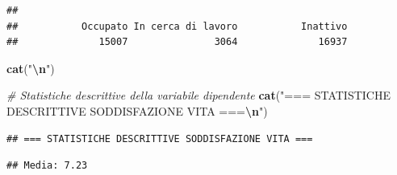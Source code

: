 \documentclass[
]{article}
\newenvironment{Shaded}{\begin{snugshade}}{\end{snugshade}}
\newcommand{\CommentTok}[1]{\textcolor[rgb]{0.56,0.35,0.01}{\textit{#1}}}
\newcommand{\DecValTok}[1]{\textcolor[rgb]{0.00,0.00,0.81}{#1}}
\newcommand{\FunctionTok}[1]{\textcolor[rgb]{0.13,0.29,0.53}{\textbf{#1}}}
\newcommand{\NormalTok}[1]{#1}
\newcommand{\SpecialCharTok}[1]{\textcolor[rgb]{0.81,0.36,0.00}{\textbf{#1}}}
\newcommand{\StringTok}[1]{\textcolor[rgb]{0.31,0.60,0.02}{#1}}
\begin{document}
\begin{verbatim}
## 
##           Occupato In cerca di lavoro           Inattivo 
##              15007               3064              16937
\end{verbatim}

\begin{Shaded}
\begin{Highlighting}[]
\FunctionTok{cat}\NormalTok{(}\StringTok{"}\SpecialCharTok{\textbackslash{}n}\StringTok{"}\NormalTok{)}
\end{Highlighting}
\end{Shaded}

\begin{Shaded}
\begin{Highlighting}[]
\CommentTok{\# Statistiche descrittive della variabile dipendente}
\FunctionTok{cat}\NormalTok{(}\StringTok{"=== STATISTICHE DESCRITTIVE SODDISFAZIONE VITA ===}\SpecialCharTok{\textbackslash{}n}\StringTok{"}\NormalTok{)}
\end{Highlighting}
\end{Shaded}

\begin{verbatim}
## === STATISTICHE DESCRITTIVE SODDISFAZIONE VITA ===
\end{verbatim}

\begin{Shaded}
\end{Shaded}

\begin{verbatim}
## Media: 7.23
\end{verbatim}

\begin{Shaded}
\end{Shaded}
\end{document}
